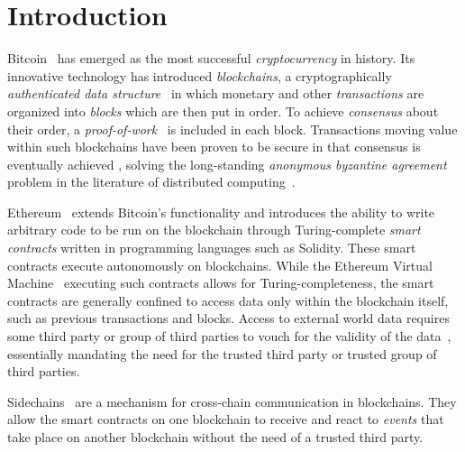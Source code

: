 \section{Introduction}

Bitcoin~\cite{bitcoin} has emerged as the most successful \emph{cryptocurrency}
in history. Its innovative technology has introduced \emph{blockchains}, a
cryptographically \emph{authenticated data
structure}~\cite{miller2014authenticated} in which monetary and other
\emph{transactions} are organized into \emph{blocks} which are then put in
order. To achieve \emph{consensus} about their order, a
\emph{proof-of-work}~\cite{C:DwoNao92} is included in each block. Transactions
moving value within such blockchains have been proven to be secure in that
consensus is eventually achieved \cite{EC:GarKiaLeo15}\cite{C:GarKiaLeo17},
solving the long-standing \emph{anonymous byzantine agreement} problem in the
literature of distributed computing~\cite{miller2014anonymous}.

Ethereum~\cite{buterin} extends Bitcoin's functionality and introduces the
ability to write arbitrary code to be run on the blockchain through
Turing-complete \emph{smart contracts} written in programming languages such as
Solidity. These smart contracts execute autonomously on blockchains.
While the Ethereum Virtual Machine~\cite{wood} executing such contracts allows
for Turing-completeness, the smart contracts are generally confined to access
data only within the blockchain itself, such as previous transactions and
blocks. Access to external world data requires some third party or group of
third parties to vouch for the validity of the data~\cite{CCS:ZCCJS16},
essentially mandating the need for the trusted third party or trusted group of
third parties.

Sidechains~\cite{sidechains} are a mechanism for cross-chain communication in
blockchains. They allow the smart contracts on one blockchain to receive and
react to \textit{events} that take place on another blockchain without the need
of a trusted third party.

